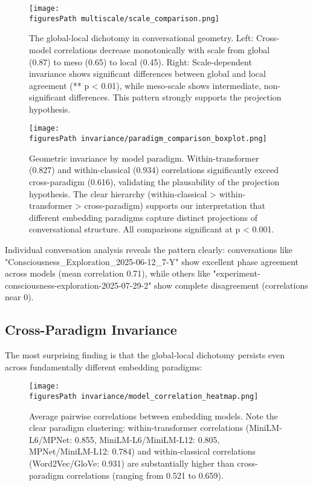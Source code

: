 \documentclass[11pt,letterpaper]{article}
\newcommand{\figuresPath}{../analysis/analysis_output/figures/}
\begin{document}
\begin{figure}[H]
\centering
\texttt{[image: \\figuresPath multiscale/scale\_comparison.png]}
\caption{The global-local dichotomy in conversational geometry. Left: Cross-model correlations decrease monotonically with scale from global (0.87) to meso (0.65) to local (0.45). Right: Scale-dependent invariance shows significant differences between global and local agreement (** p < 0.01), while meso-scale shows intermediate, non-significant differences. This pattern strongly supports the projection hypothesis.}
\label{fig:dichotomy}
\end{figure}

\begin{figure}[H]
\centering
\texttt{[image: \\figuresPath invariance/paradigm\_comparison\_boxplot.png]}
\caption{Geometric invariance by model paradigm. Within-transformer (0.827) and within-classical (0.934) correlations significantly exceed cross-paradigm (0.616), validating the plausability of the projection hypothesis. The clear hierarchy (within-classical > within-transformer > cross-paradigm) supports our interpretation that different embedding paradigms capture distinct projections of conversational structure. All comparisons significant at p < 0.001.}
\label{fig:paradigm}
\end{figure}

Individual conversation analysis reveals the pattern clearly: conversations like "Consciousness\_Exploration\_2025-06-12\_7-Y" show excellent phase agreement across models (mean correlation 0.71), while others like "experiment-consciousness-exploration-2025-07-29-2" show complete disagreement (correlations near 0).

\subsection{Cross-Paradigm Invariance}

The most surprising finding is that the global-local dichotomy persists even across fundamentally different embedding paradigms:

\begin{figure}[h]
\centering
\texttt{[image: \\figuresPath invariance/model\_correlation\_heatmap.png]}
\caption{Average pairwise correlations between embedding models. Note the clear paradigm clustering: within-transformer correlations (MiniLM-L6/MPNet: 0.855, MiniLM-L6/MiniLM-L12: 0.805, MPNet/MiniLM-L12: 0.784) and within-classical correlations (Word2Vec/GloVe: 0.931) are substantially higher than cross-paradigm correlations (ranging from 0.521 to 0.659).}
\label{fig:pairwise}
\end{figure}
\end{document}
